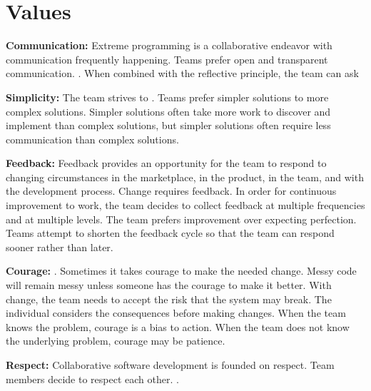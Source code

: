 \section{Values}
\textbf{Communication:} Extreme programming is a collaborative endeavor with communication frequently happening. Teams prefer open and transparent communication. 
 \cite{BeckExtremeProgramming2004}. When combined with the reflective principle, the team can ask  \cite{BeckExtremeProgramming2004}


\textbf{Simplicity:} The team strives to  \cite{BeckExtremeProgramming2004}. Teams prefer simpler solutions to more complex solutions. Simpler solutions often take more work to discover and implement than complex solutions, but simpler solutions often require less communication than complex solutions.










\textbf{Feedback:} Feedback provides an opportunity for the team to respond to changing circumstances in the marketplace, in the product, in the team, and with the development process. Change requires feedback. In order for continuous improvement to work, the team decides to collect feedback at multiple frequencies and at multiple levels. The team prefers improvement over expecting perfection. Teams attempt to shorten the feedback cycle so that the team can respond sooner rather than later.


\textbf{Courage:}    \cite{BeckExtremeProgramming2004}. Sometimes it takes courage to make the needed change. Messy code will remain messy unless someone has the courage to make it better. With change, the team needs to accept the risk that the system may break. The individual considers the consequences before making changes. When the team knows the problem, courage is a bias to action. When the team does not know the underlying problem, courage may be patience. 


\textbf{Respect:} Collaborative software development is founded on respect. Team members decide to respect each other.  \cite{BeckExtremeProgramming2004}.



